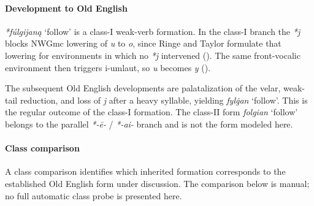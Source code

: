 \documentclass[
  british,
  a4paper,
]{article}
\providecommand{\Recon}[1]{\emph{*#1}}
\begin{document}
\paragraph{Development to Old
English}\label{development-to-old-english-97}

\Recon{fúlgijaną} `follow' is a class-I weak-verb formation. In the
class-I branch the \emph{*j} blocks NWGmc lowering of \emph{u} to
\emph{o}, since Ringe and Taylor formulate that lowering for
environments in which no \emph{*j} intervened
(). The same
front-vocalic environment then triggers i-umlaut, so \emph{u} becomes
\emph{y} ().

The subsequent Old English developments are palatalization of the velar,
weak-tail reduction, and loss of \emph{j} after a heavy syllable,
yielding {\emph{fylġan}} `follow'. This is the regular outcome of the
class-I formation. The class-II form {\emph{folgian}} `follow' belongs
to the parallel \emph{*-ē-} / \emph{*-ai-} branch and is not the form
modeled here.

\paragraph{Class comparison}\label{class-comparison-1}

A class comparison identifies which inherited formation corresponds to
the established Old English form under discussion. The comparison below
is manual; no full automatic class probe is presented here.
\end{document}
